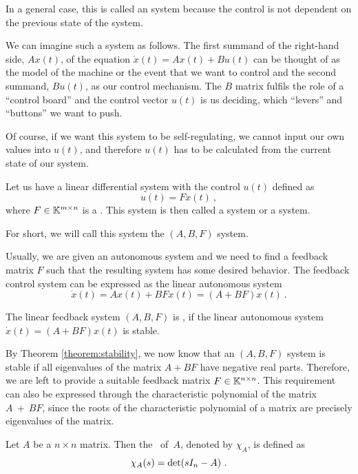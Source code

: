 In a general case, this is called an  system because the control is not dependent on the previous state of the system.

We can imagine such a system as follows. The first summand of the right-hand side, $Ax(t)$, of the equation $\dot{x}(t)=Ax(t)+Bu(t)$ can be thought of as the model of the machine or the event that we want to control and the second summand, $Bu(t)$, as our control mechanism. The $B$ matrix fulfils the role of a ``control board'' and the control vector $u(t)$ is us deciding, which ``levers'' and ``buttons'' we want to push. 

Of course, if we want this system to be self-regulating, we cannot input our own values into $u(t)$, and therefore $u(t)$ has to be calculated from the current state of our system.

\begin{definition}
	Let us have a linear differential system with the control $u(t)$ defined as
	$$u(t)=Fx(t)\ ,$$
	where $F\in\mathbb{K}^{m\times n}$ is a . This system is then called a  system or a  system.

	For short, we will call this system the $(A,B,F)$ system.
\end{definition}

Usually, we are given an autonomous system and we need to find a feedback matrix $F$ such that the resulting system has some desired behavior. The feedback control system can be expressed as the linear autonomous system
$$\dot{x}(t)=Ax(t)+BFx(t)=(A+BF)x(t)\ .$$

\begin{definition}
	The linear feedback system $(A,B,F)$ is , if the linear autonomous system $\dot{x}(t)=(A+BF)x(t)$ is stable.
\end{definition}

By Theorem \ref{theorem:stability}, we now know that an $(A,B,F)$ system is stable if all eigenvalues of the matrix $A+BF$ have negative real parts. Therefore, we are left to provide a suitable feedback matrix $F \in \mathbb{K}^{n \times n}$. This requirement can also be expressed through the characteristic polynomial of the matrix $A~+~BF$, since the roots of the characteristic polynomial of a matrix are precisely eigenvalues of the matrix.

\begin{definition}
	Let $A$ be a $n\times n$ matrix. Then the ~of~$A$, denoted by $\chi_A$, is defined as $$\chi_A(s)=\textnormal{det}(sI_n-A)\ .$$
\end{definition}

